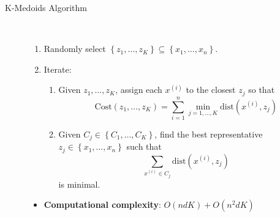 \documentclass[a4paper, 10pt,landscape]{article}
\begin{document}
\begin{multicols*}{3}
\begin{description}
	\item[K-Medoids Algorithm]~
		\begin{enumerate}
			\item Randomly select $\left\{z_1,\dots,z_K\right\}\subseteq\left\{x_1,\dots,x_n\right\}$.
			\item Iterate:
			\begin{enumerate}
				\item Given $z_1,\dots,z_K$, assign each $x^{(i)}$ to the closest $z_j$ so that
				$$\text{Cost}\left(z_1,\dots,z_K\right)=\sum_{i=1}^{n}\min\limits_{j=1,\dots,K}\text{dist}\left(x^{(i)},z_j\right)$$
				\item Given $C_j\in\left\{C_1,\dots,C_K\right\}$, find the best representative $z_j\in\left\{x_1,\dots,x_n\right\}$ such that
				$$\sum\limits_{x^{(i)}\in C_j}\text{dist}\left(x^{(i)},z_j\right)$$
				is minimal.
			\end{enumerate}
		\end{enumerate}
		\begin{itemize}
			\item {\bf Computational complexity}: $O(ndK) + O(n^2dK)$
		\end{itemize}


\end{description}
\end{multicols*}
\end{document}
